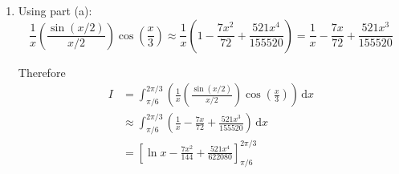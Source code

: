 \documentclass[leqno]{article}
\begin{document}
\begin{enumerate}[
  label=\textbf{\arabic*.},
  leftmargin=*,
  topsep=0pt,
  partopsep=0pt,
  parsep=0pt
]
\begin{djsSolution}
\begin{enumerate}[label=\textbf{(\alph*)}]
With \(u=\frac{x}{2}\):
\begin{align*}
\sin\left(\frac{x}{2}\right)
&=\frac{x}{2}-\frac{1}{3!}\left(\frac{x}{2}\right)^3+\frac{1}{5!}\left(\frac{x}{2}\right)^5+\cdots \\
&=\frac{x}{2}-\frac{x^3}{48}+\frac{x^5}{3840}+\cdots
\end{align*}

So
\[
\frac{\sin(x/2)}{x/2}
=1-\frac{x^2}{24}+\frac{x^4}{1920}+\cdots
\]

Also, with \(u=\frac{x}{3}\):
\begin{align*}
\cos\left(\frac{x}{3}\right)
&=1-\frac{1}{2!}\left(\frac{x}{3}\right)^2+\frac{1}{4!}\left(\frac{x}{3}\right)^4+\cdots \\
&=1-\frac{x^2}{18}+\frac{x^4}{1944}+\cdots
\end{align*}

Now multiply the two series, keeping terms up to \(x^4\):
\begin{align*}
\left(\frac{\sin(x/2)}{x/2}\right)\cos\left(\frac{x}{3}\right)
&=\left(1-\frac{x^2}{24}+\frac{x^4}{1920}\right)\left(1-\frac{x^2}{18}+\frac{x^4}{1944}\right) \\
&=1-\left(\frac{1}{24}+\frac{1}{18}\right)x^2
+\left(\frac{1}{1920}+\frac{1}{1944}+\frac{1}{24}\times\frac{1}{18}\right)x^4+\cdots \\
&=1-\frac{7x^2}{72}+\frac{521x^4}{155520}+\cdots
\end{align*}

  \item Using part (a):
\[
\frac{1}{x}\left(\frac{\sin(x/2)}{x/2}\right)\cos\left(\frac{x}{3}\right)
\approx \frac{1}{x}\left(1-\frac{7x^2}{72}+\frac{521x^4}{155520}\right)
= \frac{1}{x}-\frac{7x}{72}+\frac{521x^3}{155520}
\]

Therefore
\begin{align*}
I&=\int_{\pi/6}^{2\pi/3}\left(\frac{1}{x}\left(\frac{\sin(x/2)}{x/2}\right)\cos\left(\frac{x}{3}\right)\right)\,\mathrm{d}x \\
&\approx \int_{\pi/6}^{2\pi/3}\left(\frac{1}{x}-\frac{7x}{72}+\frac{521x^3}{155520}\right)\,\mathrm{d}x \\
&= \left[\ln x-\frac{7x^2}{144}+\frac{521x^4}{622080}\right]_{\pi/6}^{2\pi/3}
\end{align*}


\end{enumerate}
\end{djsSolution}
\end{enumerate}
\end{document}

